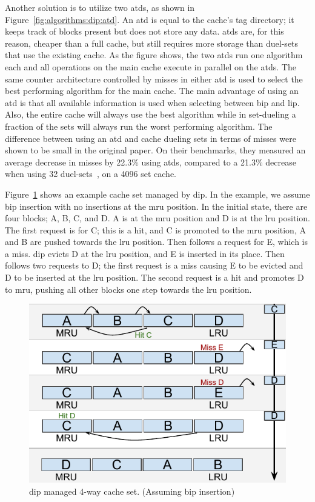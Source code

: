 Another solution is to utilize two \glspl{atd}, as shown in Figure~\ref{fig:algorithms:dip:atd}.
An \gls{atd} is equal to the cache's tag directory; it keeps track of blocks present but does not store any data.
\glspl{atd} are, for this reason, cheaper than a full cache, but still requires more storage than duel-sets that use the existing cache.
As the figure shows, the two \glspl{atd} run one algorithm each and all operations on the main cache execute in parallel on the \glspl{atd}.
The same counter architecture controlled by misses in either \gls{atd} is used to select the best performing algorithm for the main cache.
The main advantage of using an \gls{atd} is that all available information is used when selecting between \gls{bip} and \gls{lip}.
Also, the entire cache will always use the best algorithm while in set-dueling a fraction of the sets will always run the worst performing algorithm.
The difference between using an \gls{atd} and cache dueling sets in terms of misses were shown to be small in the original paper.
On their benchmarks, they measured an average decrease in misses by 22.3\% using \glspl{atd}, compared to a 21.3\% decrease when using 32 duel-sets~\cite{Qureshi2007}, on a 4096 set cache.

Figure~\ref{fig:algorithms:bip_example} shows an example cache set managed by \gls{dip}.
In the example, we assume \gls{bip} insertion with no insertions at the \gls{mru} position.
In the initial state, there are four blocks; A, B, C, and D.
A is at the \gls{mru} position and D is at the \gls{lru} position.
The first request is for C; this is a hit, and C is promoted to the \gls{mru} position, A and B are pushed towards the \gls{lru} position.
Then follows a request for E, which is a miss.
\gls{dip} evicts D at the \gls{lru} position, and E is inserted in its place.
Then follows two requests to D; the first request is a miss causing E to be evicted and D to be inserted at the \gls{lru} position.
The second request is a hit and promotes D to \gls{mru}, pushing all other blocks one step towards the \gls{lru} position.

\begin{figure}[t]
    \centering
    \includegraphics[width=.65\textwidth]{figures/algorithms/DIP}
    \caption[DIP managed 4-way cache set.]{\gls{dip} managed 4-way cache set. (Assuming \gls{bip} insertion)}
    \label{fig:algorithms:bip_example}
\end{figure}
